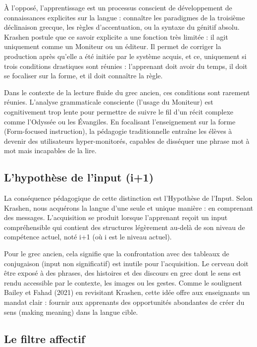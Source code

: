 À l'opposé, l'apprentissage est un processus conscient de développement de connaissances explicites
sur la langue : connaître les paradigmes de la troisième déclinaison grecque, les règles
d'accentuation, ou la syntaxe du génitif absolu. Krashen postule que ce savoir explicite a une
fonction très limitée : il agit uniquement comme un \og Moniteur\fg{} ou un éditeur. Il permet de
corriger la production après qu'elle a été initiée par le système acquis, et ce, uniquement si trois
conditions drastiques sont réunies : l'apprenant doit avoir du temps, il doit se focaliser sur la
forme, et il doit connaître la règle.\cite{II-3-3-ref2}

Dans le contexte de la lecture fluide du grec ancien, ces conditions sont rarement réunies.
L'analyse grammaticale consciente (l'usage du Moniteur) est cognitivement trop lente pour permettre
de suivre le fil d'un récit complexe comme l'Odyssée ou les Évangiles. En focalisant l'enseignement
sur la forme (Form-focused instruction), la pédagogie traditionnelle entraîne les élèves à devenir
des utilisateurs hyper-monitorés, capables de disséquer une phrase mot à mot mais incapables de la
lire.



\subsection{L'hypothèse de l'input (i+1)}

La conséquence pédagogique de cette distinction est l'Hypothèse de l'Input. Selon Krashen, nous
acquérons la langue d'une seule et unique manière : en comprenant des messages. L'acquisition se
produit lorsque l'apprenant reçoit un input compréhensible qui contient des structures légèrement
au-delà de son niveau de compétence actuel, noté i+1 (où i est le niveau actuel).\cite{II-3-3-ref1}

Pour le grec ancien, cela signifie que la confrontation avec des tableaux de conjugaison (input non
significatif) est inutile pour l'acquisition. Le cerveau doit être exposé à des phrases, des
histoires et des discours en grec dont le sens est rendu accessible par le contexte, les images ou
les gestes. Comme le soulignent Bailey et Fahad (2021) en revisitant Krashen, cette idée offre aux
enseignants un mandat clair : fournir aux apprenants des opportunités abondantes de \og créer du
sens\fg{} (making meaning) dans la langue cible.\cite{II-3-3-ref4}



\subsection{Le filtre affectif}

